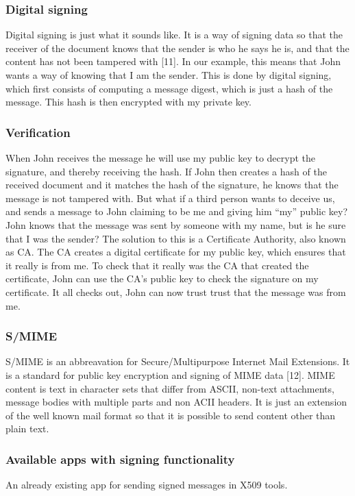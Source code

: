 \subsubsection{Digital signing}
Digital signing is just what it sounds like. It is a way of signing data so that the receiver of the document knows that the sender is
who he says he is, and that the content has not been tampered with [11]. In our example, this means that John wants a way of knowing that I am the sender. This is done by digital signing, which first consists of computing a message digest,
which is just a hash of the message. This hash is then encrypted with my private key.


\subsubsection{Verification}
When John receives the message he will use my public key to decrypt the signature, and thereby receiving the hash. If John then creates a hash of the received document and it matches the hash of the signature, he knows that the message is not tampered with. 
\newline
\newline
But what if a third person wants to deceive us, and sends a message to John claiming to be me and giving him “my” public key? John knows that the message was sent by someone with my name, but is he sure that I was the sender? The solution to this is a Certificate Authority, also known as CA. The CA creates a digital certificate for my public key, which ensures that it really is from me. To check that it really was the CA that created the certificate, John can use the CA's public key to check the signature on my certificate. It all checks out, John can now trust trust that the message was from me.

\subsubsection{S/MIME}
S/MIME is an abbreavation for Secure/Multipurpose Internet Mail Extensions. It is a standard for public key encryption and signing of MIME data [12]. MIME content is text in character sets that differ from ASCII, non-text attachments, message bodies with multiple parts and non ACII headers. It is just an extension of the well known mail format so that it is possible to send content other than plain text.

\subsubsection{Available apps with signing functionality}
An already existing app for sending signed messages in X509 tools.

